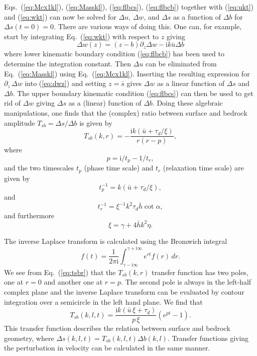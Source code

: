 \documentclass[10pt,a4paper]{book}
\newcommand{\p}{\partial}
\newcommand{\I}{\mathrm{i}}
\newcommand{\T}{T}
\begin{document}
Eqs.~(\ref{eq:Mcx1kl}), (\ref{eq:Masskl}), (\ref{eq:flbcs}),
(\ref{eq:flbcb}) together with (\ref{eq:ukt}) and (\ref{eq:wkt}) can
now be solved for $\Delta u$, $\Delta w$, and $\Delta s$ as a function
of $\Delta b$ for $\Delta s(t=0)=0$. There are various ways of doing
this.  One can, for example, start by integrating Eq.~(\ref{eq:wkt})
with respect to $z$ giving
\begin{equation}
\Delta w(z)= (z-b) \p_z \Delta w -\I k \bar{u} \Delta b
\label{eq:dwz}
\end{equation}
where lower kinematic boundary condition (\ref{eq:flbcb}) has been
used to determine the integration constant. Then $\Delta u$ can be
eliminated from Eq.~(\ref{eq:Masskl}) using
Eq.~(\ref{eq:Mcx1kl}). Inserting the resulting expression for $\p_z
\, \Delta w$ into (\ref{eq:dwz}) and setting $z=\bar{s}$ gives $\Delta w$ as a 
linear function of $\Delta s$ and $\Delta b$. The upper boundary
kinematic condition (\ref{eq:flbcs}) can then be used to get rid of
$\Delta w$ giving $\Delta s$ as a (linear) function of $\Delta b$.
Doing these algebraic manipulations, one finds that the (complex)
ratio between surface and bedrock amplitude $\T_{sb}=\Delta s/\Delta
b$ is given by
\begin{equation}
\T_{sb}(k,r)=-\frac{\I k (\bar{u}+\tau_d/\xi)}{r (r-p)},
\label{eq:tsbr}
\end{equation}
where 
\begin{equation}
p=\I/t_p-1/t_r,
\label{eq:p}
\end{equation}
and the two timescales $t_p$ (phase time scale) and $t_r$ (relaxation
time scale) are given by
\begin{equation}
t_p^{-1}=k (\bar{u}+\tau_d/\xi),
\label{eq:sistp}
\end{equation}
and
\begin{equation}
t_r^{-1}=\xi^{-1} k^2 \tau_d \bar{h} \cot \alpha ,
\label{eq:sistd}
\end{equation}
and furthermore
\begin{equation}
\xi=\gamma+4 \bar{h} k^2 \eta.
\end{equation}


The inverse Laplace transform is calculated using the Bromwich
integral
\begin{equation} 
f(t)= \frac{1}{2\pi \I} \int_{\gamma-\I \infty}^{\gamma+\I \infty} e^{rt}
f(r) \, dr .
\end{equation} 
We see from Eq.~(\ref{eq:tsbr}) that the $\T_{sb}(k,r)$ transfer
function has two poles, one at $r=0$ and another one at $r=p$. The
second pole is always in the left-half complex plane and the inverse
Laplace transform can be evaluated by contour integration over a
semicircle in the left hand plane. We find that
\begin{equation}
\T_{sb}(k,l,t)=\frac{\I k (\bar{u} \,\xi + \tau_d)}{p \,\xi} (e^{pt}-1).
\label{eq:sisTsb}
\end{equation}
This transfer function describes the relation between surface and
bedrock geometry, where $\Delta s(k,l,t)= \T_{sb}(k,l,t) \Delta
b(k,l)$. Transfer functions giving the perturbation in velocity can be
calculated in the same manner.
\end{document}
